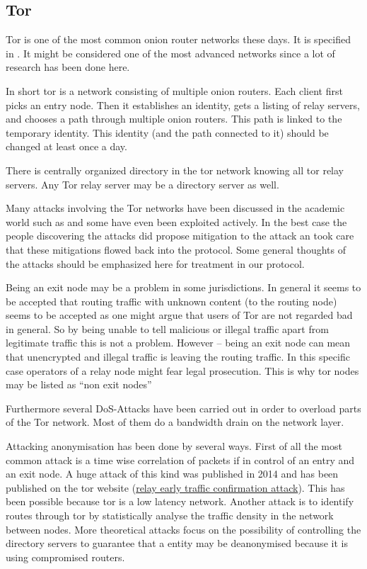 \subsection{Tor\label{sec:tor}}
Tor is one of the most common onion router networks these days. It is specified in \cite{tor-spec}. It might be considered  one of the most advanced networks since a lot of research has been done here.

In short tor is a network consisting of multiple onion routers. Each client first picks an entry node. Then it establishes an identity, gets a listing of relay servers, and chooses a path through multiple onion routers. This path is linked to the temporary identity. This identity (and the path connected to it) should be changed at least once a day. 

There is centrally organized directory in the tor network knowing all tor relay servers. Any Tor relay server may be a directory server as well.

Many attacks involving the Tor networks have been discussed in the academic world such as \cite{hs-attack06,esorics13-cellflood,bauer:wpes2007,esorics12-torscan,oakland2013-trawling,danner-et-al:tissec12,congestion-longpaths} and some have even been exploited actively. In the best case the people discovering the attacks did propose mitigation to the attack an took care that these mitigations flowed back into the protocol. Some general thoughts of the attacks should be emphasized here for treatment in our protocol.

Being an exit node may be a problem in some jurisdictions. In general it seems to be accepted that routing traffic with unknown content (to the routing node) seems to be accepted as one might argue that users of Tor are not regarded bad in general. So by being unable to tell malicious or illegal traffic apart from legitimate traffic this is not a problem. However -- being an exit node can mean that unencrypted and illegal traffic is leaving the routing traffic. In this specific case operators of a relay node might fear legal prosecution. This is why tor nodes may be listed as ``non exit nodes'' 

Furthermore several DoS-Attacks have been carried out in order to overload parts of the Tor network. Most of them do a bandwidth drain on the network layer.

Attacking anonymisation has been done by several ways. First of all the most common attack is a time wise correlation of packets if in control of an entry and an exit node. A huge attack of this kind was published in 2014 and has been published on the tor website (\href{https://blog.torproject.org/blog/tor-security-advisory-relay-early-traffic-confirmation-attack}{relay early traffic confirmation attack}). This has been possible because tor is a low latency network. Another attack is to identify routes through tor by statistically analyse the traffic density in the network between nodes. More theoretical attacks focus on the possibility of controlling the directory servers to guarantee that a entity may be deanonymised because it is using compromised routers.

